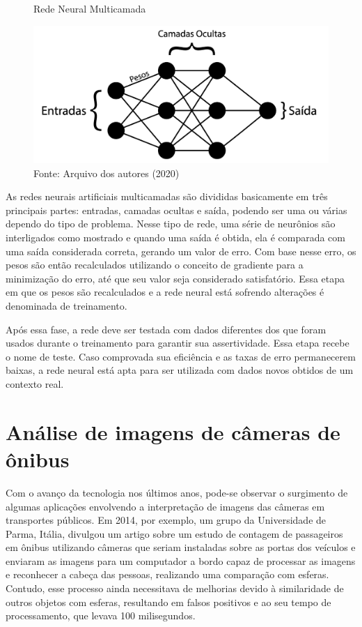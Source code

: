 \begin{figure}[H]
    \centering
    \caption{Rede Neural Multicamada}
    \includegraphics[width=1.0\linewidth]{Imagens/rede-neural.png}
    \caption*{Fonte: Arquivo dos autores (2020)}
    \label{redeneural}
\end{figure}

\par As redes neurais artificiais multicamadas são divididas basicamente em três principais partes: entradas, camadas ocultas e saída, podendo ser uma ou várias dependo do tipo de problema. Nesse tipo de rede, uma série de neurônios são interligados como mostrado e quando uma saída é obtida, ela é comparada com uma saída considerada correta, gerando um valor de erro. Com base nesse erro, os pesos são então recalculados utilizando o conceito de gradiente para a minimização do erro, até que seu valor seja considerado satisfatório. Essa etapa em que os pesos são recalculados e a rede neural está sofrendo alterações é denominada de treinamento.

\par Após essa fase, a rede deve ser testada com dados diferentes dos que foram usados durante o treinamento para garantir sua assertividade. Essa etapa recebe o nome de teste. Caso comprovada sua eficiência e as taxas de erro permanecerem baixas, a rede neural está apta para ser utilizada com dados novos obtidos de um contexto real.



\section{Análise de imagens de câmeras de ônibus}

\indent
\par Com o avanço da tecnologia nos últimos anos, pode-se observar o surgimento de algumas aplicações envolvendo a interpretação de imagens das câmeras em transportes públicos. Em 2014, por exemplo, um grupo da Universidade de Parma, Itália, divulgou um artigo \cite{Bernini2014} sobre um estudo de contagem de passageiros em ônibus utilizando câmeras que seriam instaladas sobre as portas dos veículos e enviaram as imagens para um computador a bordo capaz de processar as imagens e reconhecer a cabeça das pessoas, realizando uma comparação com esferas. Contudo, esse processo ainda necessitava de melhorias devido à similaridade de outros objetos com esferas, resultando em falsos positivos e ao seu tempo de processamento, que levava 100 milisegundos.

